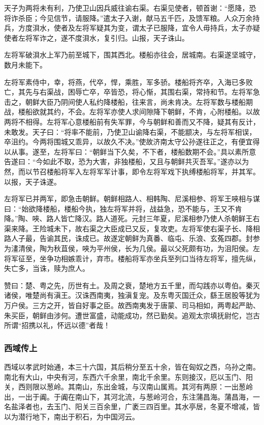 \documentclass[]{article}
\begin{document}
天子为两将未有利，乃使卫山因兵威往谕右渠。右渠见使者，顿首谢：``愿降，恐将诈杀臣；今见信节，请服降。''遣太子入谢，献马五千匹，及馈军粮。人众万余持兵，方度浿水，使者及左将军疑其为变，谓太子已服降，宜令人毋持兵，太子亦疑使者左将军诈之，遂不度浿水，复引归。山报，天子诛山。

左将军破浿水上军乃前至城下，围其西北。楼船亦往会，居城南。右渠遂坚城守，数月未能下。

左将军素侍中，幸，将燕，代卒，悍，乘胜，军多骄。楼船将齐卒，入海已多败亡，其先与右渠战，困辱亡卒，卒皆恐，将心惭，其围右渠，常持和节。左将军急击之，朝鲜大臣乃阴间使人私约降楼船，往来言，尚未肯决。左将军数与楼船期战，楼船欲就其约，不会。左将军亦使人求间隙降下朝鲜，不肯，心附楼船。以故两将不相得。左将军心意楼船前有失军罪，今与朝鲜和善而又不降，疑其有反计，未敢发。天子曰：``将率不能前，乃使卫山谕降右渠，不能颛决，与左将军相误，卒沮约。今两将围城又乖异，以故久不决。''使故济南太守公孙遂往正之，有便宜得以从事。遂至，左将军曰：``朝鲜当下久矣，不下者，楼船数期不会。''具以素所意告遂曰：``今如此不取，恐为大害，非独楼船，又且与朝鲜共灭吾军。''遂亦以为然，而以节召楼船将军入左将军军计事，即令左将军戏下执缚楼船将军，并其军。以报，天子诛遂。

左将军已并两军，即急击朝鲜。朝鲜相路人、相韩陶、尼溪相参、将军王唊相与谋曰：``始欲降楼船，楼船今执，独左将军并将，战益急，恐不能与，王又不肯降。''陶、唊、路人皆亡降汉。路人道死。元封三年夏，尼溪相参乃使人杀朝鲜王右渠来降。王险城未下，故右渠之大臣成已又反，复攻吏。左将军使右渠子长、降相路人子最，告谕其民，诛成已。故遂定朝鲜为真番、临屯、乐浪、玄菟四郡。封参为澅清侯，陶为秋苴侯，唊为平州侯，长为几侯。最以父死颇有功，为沮阳侯。左将军征至，坐争功相嫉乖计，弃市。楼船将军亦坐兵至列口当待左将军，擅先纵，失亡多，当诛，赎为庶人。

赞曰：楚、粤之先，历世有土。及周之衰，楚地方五千里，而勾践亦以粤伯。秦灭诸侯，唯楚尚有滇王。汉诛西南夷，独滇复宠。及东粤灭国迁众，繇王居股等犹为万户侯。三方之开，皆自好事之臣。故西南夷发于唐蒙、司马相如，两粤起严助、朱买臣，朝鲜由涉何。遭世富盛，动能成功，然已勤矣。追观太宗填抚尉佗，岂古所谓``招携以礼，怀远以德''者哉！

\hypertarget{header-n6364}{%
\subsubsection{西域传上}\label{header-n6364}}

西域以孝武时始通，本三十六国，其后稍分至五十余，皆在匈奴之西，乌孙之南。南北有大山，中央有河，东西六千余里，南北千余里。东则接汉，厄以玉门、阳关，西则限以葱岭。其南山，东出金城，与汉南山属焉。其河有两原：一出葱岭出，一出于阗。于阗在南山下，其河北流，与葱岭河合，东注蒲昌海。蒲昌海，一名盐泽者也，去玉门、阳关三百余里，广袤三四百里。其水亭居，冬夏不增减，皆以为潜行地下，南出于积石，为中国河云。
\end{document}
